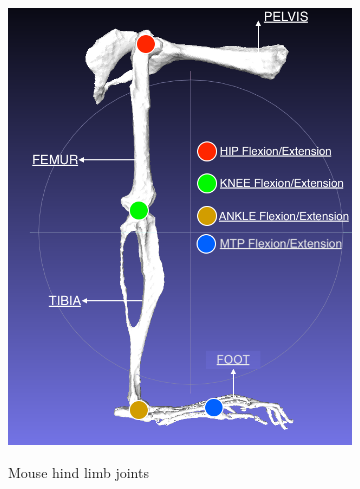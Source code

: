 \documentclass{cmc}
\begin{document}
\begin{figure}[H]
  \centering
  \begin{subfigure}[b]{0.49\textwidth}
    { \centering
      \includegraphics[width=\textwidth]{figures/HindLimbJoints.png} }
    \caption{Mouse hind limb joints}
    \label{fig:hind_limb_joints}
  \end{subfigure}
  \begin{subfigure}[b]{0.49\textwidth}
    { \centering
}
\end{subfigure}
\end{figure}
\end{document}
